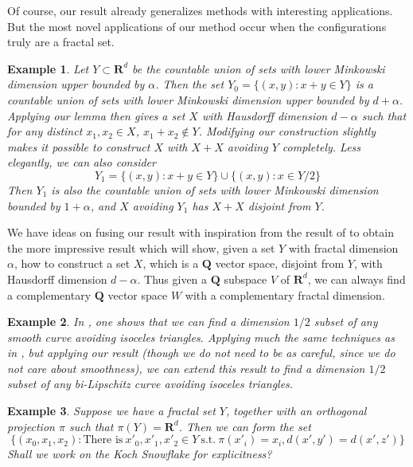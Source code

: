 \documentclass{article}
\theoremstyle{plain}
\newtheorem*{example}{Example}
\theoremstyle{plain}
\begin{document}
Of course, our result already generalizes methods with interesting applications. But the most novel applications of our method occur when the configurations truly are a fractal set.

\begin{example}
	Let $Y \subset \mathbf{R}^d$ be the countable union of sets with lower Minkowski dimension upper bounded by $\alpha$. Then the set $Y_0 = \{ (x,y): x + y \in Y \}$ is a countable union of sets with lower Minkowski dimension upper bounded by $d + \alpha$. Applying our lemma then gives a set $X$ with Hausdorff dimension $d - \alpha$ such that for any distinct $x_1, x_2 \in X$, $x_1 + x_2 \not \in Y$. Modifying our construction slightly makes it possible to construct $X$ with $X + X$ avoiding $Y$ completely. Less elegantly, we can also consider
	\[ Y_1 = \{ (x,y) : x + y \in Y \} \cup \{ (x,y): x \in Y/2 \} \]
	Then $Y_1$ is also the countable union of sets with lower Minkowski dimension bounded by $1 + \alpha$, and $X$ avoiding $Y_1$ has $X + X$ disjoint from $Y$.
\end{example}

We have ideas on fusing our result with inspiration from the result of \cite{Mathe} to obtain the more impressive result which will show, given a set $Y$ with fractal dimension $\alpha$, how to construct a set $X$, which is a $\mathbf{Q}$ vector space, disjoint from $Y$, with Hausdorff dimension $d - \alpha$. Thus given a $\mathbf{Q}$ subspace $V$ of $\mathbf{R}^d$, we can always find a complementary $\mathbf{Q}$ vector space $W$ with a complementary fractal dimension.

\begin{example}
	In \cite{MalabikaRob}, one shows that we can find a dimension $1/2$ subset of any smooth curve avoiding isoceles triangles. Applying much the same techniques as in \cite{MalabikaRob}, but applying our result (though we do not need to be as careful, since we do not care about smoothness), we can extend this result to find a dimension $1/2$ subset of any {\it bi-Lipschitz} curve avoiding isoceles triangles.
\end{example}

\begin{example}
	Suppose we have a fractal set $Y$, together with an orthogonal projection $\pi$ such that $\pi(Y) = \mathbf{R}^d$. Then we can form the set
	\[ \{ (x_0,x_1,x_2): \text{There is}\ x'_0,x'_1,x'_2 \in Y\ \text{s.t.}\ \pi(x'_i) = x_i, d(x',y') = d(x',z') \} \]
	Shall we work on the Koch Snowflake for explicitness?
\end{example}
\end{document}
